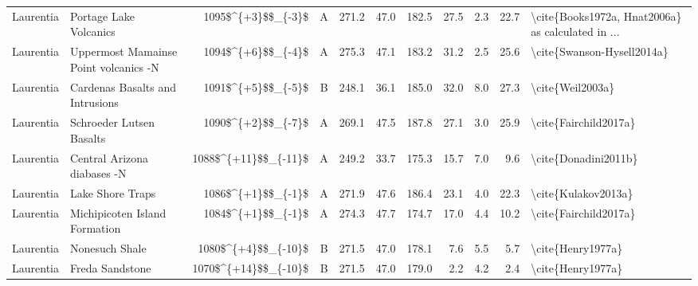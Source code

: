 \begin{longtable}{p{1 in}p{1 in}rrrrrrrr}
                     Laurentia &                             Portage Lake Volcanics &     1095\$\textasciicircum \{+3\}\$\$\_\{-3\}\$ &      A &     271.2 &      47.0 & 182.5 &  27.5 &       2.3 &        22.7 &  \textbackslash cite\{Books1972a, Hnat2006a\} as calculated in ... \\
                     Laurentia &              Uppermost Mamainse Point volcanics -N &     1094\$\textasciicircum \{+6\}\$\$\_\{-4\}\$ &      A &     275.3 &      47.1 & 183.2 &  31.2 &       2.5 &        25.6 &                         \textbackslash cite\{Swanson-Hysell2014a\} \\
                     Laurentia &                    Cardenas Basalts and Intrusions &     1091\$\textasciicircum \{+5\}\$\$\_\{-5\}\$ &      B &     248.1 &      36.1 & 185.0 &  32.0 &       8.0 &        27.3 &                                   \textbackslash cite\{Weil2003a\} \\
                     Laurentia &                           Schroeder Lutsen Basalts &     1090\$\textasciicircum \{+2\}\$\$\_\{-7\}\$ &      A &     269.1 &      47.5 & 187.8 &  27.1 &       3.0 &        25.9 &                              \textbackslash cite\{Fairchild2017a\} \\
                     Laurentia &                        Central Arizona diabases -N &   1088\$\textasciicircum \{+11\}\$\$\_\{-11\}\$ &      A &     249.2 &      33.7 & 175.3 &  15.7 &       7.0 &         9.6 &                               \textbackslash cite\{Donadini2011b\} \\
                     Laurentia &                                   Lake Shore Traps &     1086\$\textasciicircum \{+1\}\$\$\_\{-1\}\$ &      A &     271.9 &      47.6 & 186.4 &  23.1 &       4.0 &        22.3 &                                \textbackslash cite\{Kulakov2013a\} \\
                     Laurentia &                      Michipicoten Island Formation &     1084\$\textasciicircum \{+1\}\$\$\_\{-1\}\$ &      A &     274.3 &      47.7 & 174.7 &  17.0 &       4.4 &        10.2 &                              \textbackslash cite\{Fairchild2017a\} \\
                     Laurentia &                                     Nonesuch Shale &    1080\$\textasciicircum \{+4\}\$\$\_\{-10\}\$ &      B &     271.5 &      47.0 & 178.1 &   7.6 &       5.5 &         5.7 &                                  \textbackslash cite\{Henry1977a\} \\
                     Laurentia &                                    Freda Sandstone &   1070\$\textasciicircum \{+14\}\$\$\_\{-10\}\$ &      B &     271.5 &      47.0 & 179.0 &   2.2 &       4.2 &         2.4 &                                  \textbackslash cite\{Henry1977a\} \\

\end{longtable}
